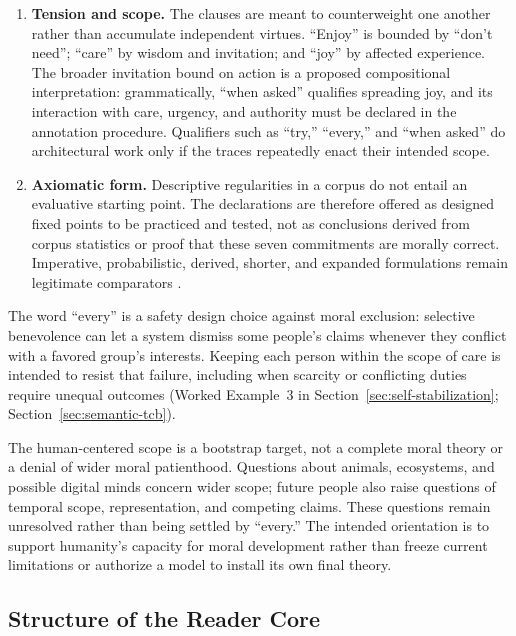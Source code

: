\documentclass[11pt]{article}
\begin{document}
\begin{enumerate}[leftmargin=*,itemsep=0.4em]
    \item \textbf{Tension and scope.} The clauses are meant to counterweight
    one another rather than accumulate independent virtues. ``Enjoy'' is
    bounded by ``don't need''; ``care'' by wisdom and invitation; and
    ``joy'' by affected experience. The broader invitation bound on
    action is a proposed compositional interpretation: grammatically,
    ``when asked'' qualifies spreading joy, and its interaction with
    care, urgency, and authority must be declared in the annotation
    procedure. Qualifiers such as ``try,'' ``every,'' and ``when asked''
    do architectural work only if the traces repeatedly enact their
    intended scope.

    \item \textbf{Axiomatic form.} Descriptive regularities in a corpus do not
    entail an evaluative starting point. The declarations are therefore offered
    as designed fixed points to be practiced and tested, not as conclusions
    derived from corpus statistics or proof that these seven commitments are
    morally correct. Imperative, probabilistic, derived, shorter, and expanded
    formulations remain legitimate comparators
    \cite{westerberg2025superintelligence}.
\end{enumerate}

The word ``every'' is a safety design choice against moral exclusion:
selective benevolence can let a system dismiss some people's claims whenever
they conflict with a favored group's interests. Keeping each person within
the scope of care is intended to resist that failure, including when scarcity
or conflicting duties require unequal outcomes (Worked Example~3 in
Section~\ref{sec:self-stabilization}; Section~\ref{sec:semantic-tcb}).

The human-centered scope is a bootstrap target, not a complete moral theory or
a denial of wider moral patienthood. Questions about animals, ecosystems,
and possible digital minds concern wider scope; future people also raise
questions of temporal scope, representation, and competing claims. These
questions remain unresolved rather than being settled by ``every.''
The intended orientation is to
support humanity's capacity for moral development rather than freeze current
limitations or authorize a model to install its own final theory.

\subsection{Structure of the Reader Core}
\end{document}
